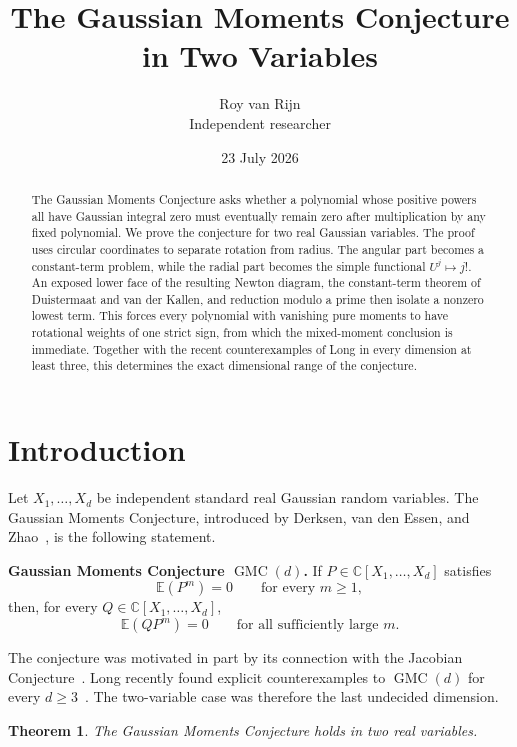\documentclass[11pt]{article}
\title{The Gaussian Moments Conjecture in Two Variables}
\author{Roy van Rijn\\{\small Independent researcher}}
\date{23 July 2026}
\newtheorem{theorem}{Theorem}[section]
\newcommand{\C}{\mathbb C}
\newcommand{\E}{\mathbb E}
\begin{document}
\maketitle

\begin{abstract}
The Gaussian Moments Conjecture asks whether a polynomial whose positive
powers all have Gaussian integral zero must eventually remain zero after
multiplication by any fixed polynomial.  We prove the conjecture for two
real Gaussian variables.  The proof uses circular coordinates to separate
rotation from radius.  The angular part becomes a constant-term problem,
while the radial part becomes the simple functional \(U^j\mapsto j!\).
An exposed lower face of the resulting Newton diagram, the constant-term
theorem of Duistermaat and van der Kallen, and reduction modulo a prime then
isolate a nonzero lowest term.  This forces every polynomial with vanishing
pure moments to have rotational weights of one strict sign, from which the
mixed-moment conclusion is immediate.  Together with the recent
counterexamples of Long in every dimension at least three, this determines
the exact dimensional range of the conjecture.
\end{abstract}

\section{Introduction}

Let \(X_1,\ldots,X_d\) be independent standard real Gaussian random
variables.  The Gaussian Moments Conjecture, introduced by Derksen, van den
Essen, and Zhao~\cite{DVZ}, is the following statement.

\medskip
\noindent
\textbf{Gaussian Moments Conjecture \(\operatorname{GMC}(d)\).}
If \(P\in\C[X_1,\ldots,X_d]\) satisfies
\[
  \E(P^m)=0\qquad\text{for every }m\geq 1,
\]
then, for every \(Q\in\C[X_1,\ldots,X_d]\),
\[
  \E(QP^m)=0\qquad\text{for all sufficiently large }m.
\]

\medskip
The conjecture was motivated in part by its connection with the Jacobian
Conjecture~\cite{DVZ}.  Long recently found explicit counterexamples to
\(\operatorname{GMC}(d)\) for every \(d\geq3\)~\cite{Long}.  The
two-variable case was therefore the last undecided dimension.

\begin{theorem}\label{thm:main}
The Gaussian Moments Conjecture holds in two real variables.
\end{theorem}
\end{document}
